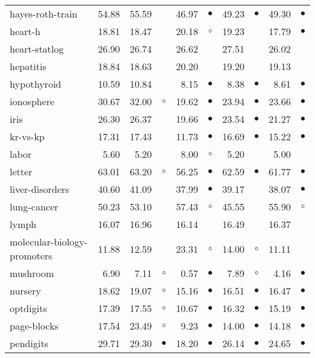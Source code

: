 {\begin{longtable}{lrr@{\hspace{0.1cm}}cr@{\hspace{0.1cm}}cr@{\hspace{0.1cm}}cr@{\hspace{0.1cm}}c}
hayes-roth-train & 54.88 & 55.59 &           & 46.97 & $\bullet$ & 49.23 & $\bullet$ & 49.30 & $\bullet$\\
heart-h & 18.81 & 18.47 &           & 20.18 &   $\circ$ & 19.23 &           & 17.79 & $\bullet$\\
heart-statlog & 26.90 & 26.74 &           & 26.62 &           & 27.51 &           & 26.02 &          \\
hepatitis & 18.84 & 18.63 &           & 20.20 &           & 19.20 &           & 19.13 &          \\
hypothyroid & 10.59 & 10.84 &           &  8.15 & $\bullet$ &  8.38 & $\bullet$ &  8.61 & $\bullet$\\
ionosphere & 30.67 & 32.00 &   $\circ$ & 19.62 & $\bullet$ & 23.94 & $\bullet$ & 23.66 & $\bullet$\\
iris & 26.30 & 26.37 &           & 19.66 & $\bullet$ & 23.54 & $\bullet$ & 21.27 & $\bullet$\\
kr-vs-kp & 17.31 & 17.43 &           & 11.73 & $\bullet$ & 16.69 & $\bullet$ & 15.22 & $\bullet$\\
labor &  5.60 &  5.20 &           &  8.00 &   $\circ$ &  5.20 &           &  5.00 &          \\
letter & 63.01 & 63.20 &   $\circ$ & 56.25 & $\bullet$ & 62.59 & $\bullet$ & 61.77 & $\bullet$\\
liver-disorders & 40.60 & 41.09 &           & 37.99 & $\bullet$ & 39.17 &           & 38.07 & $\bullet$\\
lung-cancer & 50.23 & 53.10 &           & 57.43 &   $\circ$ & 45.55 &           & 55.90 &   $\circ$\\
lymph & 16.07 & 16.96 &           & 16.14 &           & 16.49 &           & 16.37 &          \\
molecular-biology-promoters & 11.88 & 12.59 &           & 23.31 &   $\circ$ & 14.00 &   $\circ$ & 11.11 &          \\
mushroom &  6.90 &  7.11 &   $\circ$ &  0.57 & $\bullet$ &  7.89 &   $\circ$ &  4.16 & $\bullet$\\
nursery & 18.62 & 19.07 &   $\circ$ & 15.16 & $\bullet$ & 16.51 & $\bullet$ & 16.47 & $\bullet$\\
optdigits & 17.39 & 17.55 &   $\circ$ & 10.67 & $\bullet$ & 16.32 & $\bullet$ & 15.19 & $\bullet$\\
page-blocks & 17.54 & 23.49 &   $\circ$ &  9.23 & $\bullet$ & 14.00 & $\bullet$ & 14.18 & $\bullet$\\
pendigits & 29.71 & 29.30 & $\bullet$ & 18.20 & $\bullet$ & 26.14 & $\bullet$ & 24.65 & $\bullet$\\

\end{longtable}}
